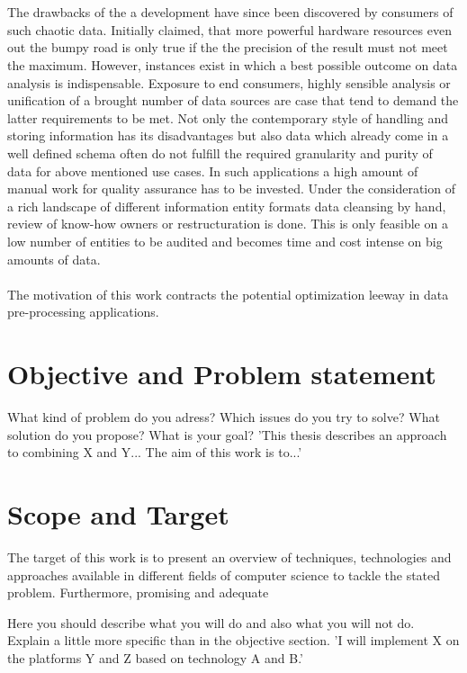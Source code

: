 \\\\
The drawbacks of the a development have since been discovered by consumers of such chaotic data. Initially claimed, that more powerful hardware resources even out the bumpy road is only true if the the precision of the result must not meet the maximum. However, instances exist in which a best possible outcome on data analysis is indispensable. Exposure to end consumers, highly sensible analysis or unification of a brought number of data sources are case that tend to demand the latter requirements to be met. Not only the contemporary style of handling and storing information has its disadvantages but also data which already come in a well defined schema often do not fulfill the required granularity and purity of data for above mentioned use cases. In such applications a high amount of manual work for quality assurance has to be invested. Under the consideration of a rich landscape of different information entity formats data cleansing by hand, review of know-how owners or restructuration is done. This is only feasible on a low number of entities to be audited and becomes time and cost intense on big amounts of data.
\\\\
The motivation of this work contracts the potential optimization leeway in data pre-processing applications. 

\section{Objective and Problem statement\label{sec:objective}}

What kind of problem do you adress? Which issues do you try to solve? What solution do you propose? What is your goal?
'This thesis describes an approach to combining X and Y... The aim of this work is to...'

\section{Scope and Target\label{sec:scope}}

The target of this work is to present an overview of techniques, technologies and approaches available in different fields of computer science to tackle the stated problem. Furthermore, promising and adequate    

Here you should describe what you will do and also what you will not do. Explain a little more specific than in the objective section. 'I will implement X on the platforms Y and Z based on technology A and B.'

